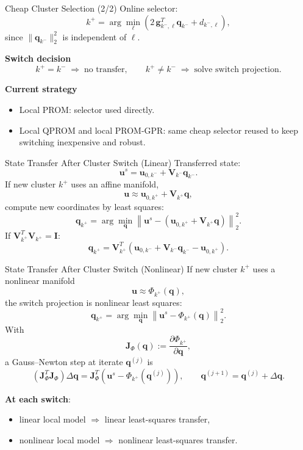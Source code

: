 \documentclass{beamer}
\begin{document}
\begin{frame}{Cheap Cluster Selection (2/2)}
\scriptsize
Online selector:
\[
k^+=\arg\min_{\ell}
\left(2\,\mathbf g_{k^-,\ell}^T\mathbf q_{k^-}+d_{k^-,\ell}\right),
\]
since $\|\mathbf q_{k^-}\|_2^2$ is independent of $\ell$.

\vspace{0.4em}
\textbf{Switch decision}
\[
k^+=k^- \;\Rightarrow\; \text{no transfer},
\qquad
k^+\neq k^- \;\Rightarrow\; \text{solve switch projection}.
\]

\vspace{0.4em}
\textbf{Current strategy}
\begin{itemize}
\item Local PROM: selector used directly.
\item Local QPROM and local PROM-GPR: same cheap selector reused to keep switching inexpensive and robust.
\end{itemize}
\end{frame}

\begin{frame}{State Transfer After Cluster Switch (Linear)}
\scriptsize
Transferred state:
\[
\mathbf u^s=\mathbf u_{0,k^-}+\mathbf V_{k^-}\mathbf q_{k^-}.
\]
If new cluster $k^+$ uses an affine manifold,
\[
\mathbf u\approx \mathbf u_{0,k^+}+\mathbf V_{k^+}\mathbf q,
\]
compute new coordinates by least squares:
\[
\mathbf q_{k^+}
=
\arg\min_{\mathbf q}
\left\|
\mathbf u^s-(\mathbf u_{0,k^+}+\mathbf V_{k^+}\mathbf q)
\right\|_2^2.
\]
If $\mathbf V_{k^+}^T\mathbf V_{k^+}=\mathbf I$:
\[
\mathbf q_{k^+}
=\mathbf V_{k^+}^T
\left(
\mathbf u_{0,k^-}+\mathbf V_{k^-}\mathbf q_{k^-}-\mathbf u_{0,k^+}
\right).
\]
\end{frame}

\begin{frame}{State Transfer After Cluster Switch (Nonlinear)}
\scriptsize
If new cluster $k^+$ uses a nonlinear manifold
\[
\mathbf u\approx \Phi_{k^+}(\mathbf q),
\]
the switch projection is nonlinear least squares:
\[
\mathbf q_{k^+}
=\arg\min_{\mathbf q}
\left\|
\mathbf u^s-\Phi_{k^+}(\mathbf q)
\right\|_2^2.
\]
With
\[
\mathbf J_{\Phi}(\mathbf q):=\frac{\partial\Phi_{k^+}}{\partial\mathbf q},
\]
a Gauss--Newton step at iterate $\mathbf q^{(j)}$ is
\[
\left(\mathbf J_{\Phi}^T\mathbf J_{\Phi}\right)\Delta\mathbf q
=
\mathbf J_{\Phi}^T\left(\mathbf u^s-\Phi_{k^+}(\mathbf q^{(j)})\right),
\qquad
\mathbf q^{(j+1)}=\mathbf q^{(j)}+\Delta\mathbf q.
\]

\vspace{0.4em}
\textbf{At each switch}:
\begin{itemize}
\item linear local model $\Rightarrow$ linear least-squares transfer,
\item nonlinear local model $\Rightarrow$ nonlinear least-squares transfer.
\end{itemize}
\end{frame}
\end{document}
